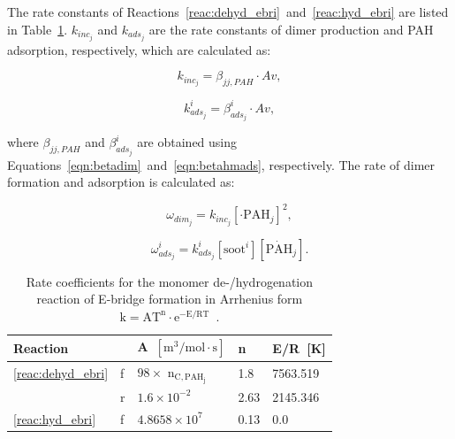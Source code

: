 


The rate constants of Reactions~\eqref{reac:dehyd_ebri}~and~\eqref{reac:hyd_ebri} are listed in Table~\ref{tab:Ebridge}. $k_{inc_j}$ and $k_{ads_j}$ are the rate constants of dimer production and PAH adsorption, respectively, which are calculated as:

\begin{equation}
	k_{inc_j}=
	\beta_{jj,PAH}\cdot Av
	\label{eqn:kdim_ebri},
\end{equation}

\begin{equation}
	k^i_{ads_{j}}=
	\beta^i_{ads_j}\cdot Av
	\label{eqn:kads_ebir},
\end{equation}

\noindent where $\beta_{jj,PAH}$ and $\beta^i_{ads_j}$ are obtained using Equations~\eqref{eqn:betadim}~and~\eqref{eqn:betahmads}, respectively. The rate of dimer formation and adsorption is calculated as:

\begin{equation}
	\omega_{dim_j} = k_{inc_{j}} [\cdot{\mathrm{PAH}}_j]^2,
	\label{eqn:wdim_ebri}
\end{equation}

\begin{equation}
	\omega^i_{ads_j} = k^i_{ads_{j}} [\mathrm{soot}^i] [\mathrm{\dot{PAH}}_j].
\end{equation}



\renewcommand{\arraystretch}{1.5}
\begin{table}
	\caption{Rate coefficients for the monomer de-/hydrogenation reaction of E-bridge formation in Arrhenius form $\mathrm{k=AT^n\cdot e^{-E/RT}}$~\citep{frenklach2020mechanism}.}
	\label{tab:Ebridge}
	\centering
	\begin{tabular}{l l l l l}
		\hline
		Reaction & \hspace{0.1cm} & A~$\mathrm{\left[{m^3}/{mol\cdot s} \right]}$ & n & {E}/{R}~[K]  \\
		\hline
		\eqref{reac:dehyd_ebri} & f & $98\times$ $\mathrm{n_{C, PAH_j}}$ & 1.8 & 7563.519 \\
		  & r & $1.6\times 10^{-2}$ & 2.63 & 2145.346\\
		\eqref{reac:hyd_ebri} & f & $4.8658\times10^7
		$ & 0.13 & 0.0\\
		\hline
	\end{tabular}
\end{table}



